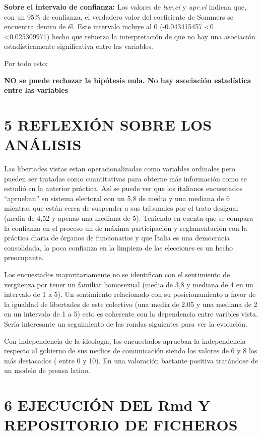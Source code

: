 \documentclass[
  12 pt,
  a4paper,
]{article}
\begin{document}
\textbf{Sobre el intervalo de confianza:} Los valores de \emph{lwr.ci} y
\emph{upr.ci} indican que, con un 95\% de confianza, el verdadero valor
del coeficiente de Sommers se encuentra dentro de él. Este intervalo
incluye al 0 (-0.043415457 \textless0 \textless0.025309971) hecho que
refuerza la interpretación de que no hay una asociación estadísticamente
significativa entre las variables.

Por todo esto:

\textbf{NO se puede rechazar la hipótesis nula. No hay asociación
estadística entre las variables}

\section{5 REFLEXIÓN SOBRE LOS
ANÁLISIS}\label{reflexiuxf3n-sobre-los-anuxe1lisis}

Las libertades vistas estan operacionalizadas como variables ordinales
pero pueden ser tratadas como cuantitativas para obterne más información
como se estudió en la anterior práctica. Así se puede ver que los
italianos encuestados ``aprueban'' su sistema electoral con un 5,8 de
media y una mediana de 6 mientras que están cerca de suspender a sus
tribunales por el trato desigual (media de 4,52 y apenas una mediana de
5). Teniendo en cuenta que se compara la confianza en el proceso un de
máxima participación y reglamentación con la práctica diaria de órganos
de funcionarios y que Italia es una democracia consolidada, la poca
confianza en la limpieza de las elecciones es un hecho preocupante.

Los encuestados mayoritariamente no se identifican con el sentimiento de
vergüenza por tener un familiar homosexual (media de 3,8 y mediana de 4
en un intervalo de 1 a 5). Un sentimiento relacionado con su
posicionamiento a favor de la igualdad de libertades de este colectivo
(una media de 2,05 y una mediana de 2 en un intervalo de 1 a 5) esto es
coherente con la dependencia entre varibles vista. Sería interesante un
seguimiento de las rondas siguientes para ver la evolución.

Con independencia de la ideología, los encuestados aprueban la
independencia respecto al gobierno de sus medios de comunicación siendo
los valores de 6 y 8 los más destacados ( entre 0 y 10). En una
valoración bastante positiva tratándose de un modelo de prensa latino.

\section{6 EJECUCIÓN DEL Rmd Y REPOSITORIO DE
FICHEROS}\label{ejecuciuxf3n-del-rmd-y-repositorio-de-ficheros}
\end{document}
